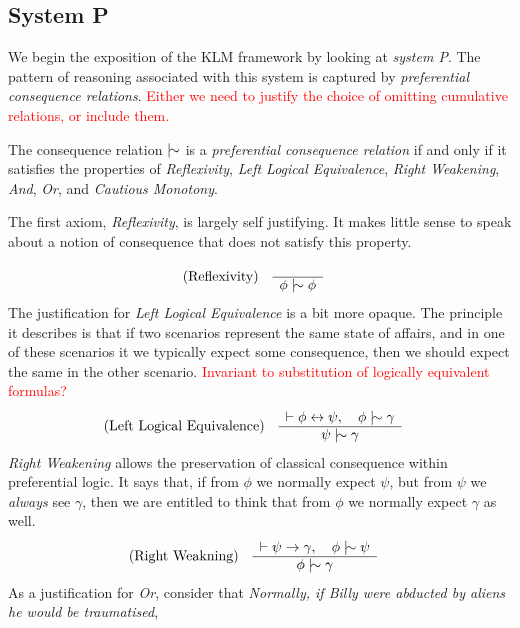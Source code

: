 \subsection{System P}
\label{subsection:system-P} 

We begin the exposition of the KLM framework by looking at \textit{system P}. The pattern of reasoning associated with
this system is captured by \textit{preferential consequence relations}. \textcolor{red}{Either we need to justify the
choice of omitting cumulative relations, or include them.}

\begin{definition}
	\label{definition:preferential-relation}

	The consequence relation $\twiddle$ is a \emph{preferential consequence relation} if and only if it satisfies the properties
	of \emph{Reflexivity}, \emph{Left Logical Equivalence}, \emph{Right Weakening}, \emph{And}, \emph{Or}, and \emph{Cautious
	Monotony}.
\end{definition}
%
The first axiom, \textit{Reflexivity}, is largely self justifying. It makes little sense to speak about a notion of
consequence that does not satisfy this property.
%
\begin{align}
	\label{postulate:ref}\inferLeft{Reflexivity}{}{\phi \twiddle \phi}
\end{align}
%
The justification for \textit{Left Logical Equivalence} is a bit more opaque. The principle it describes is that if two scenarios
represent the same state of affairs, and in one of these scenarios it we typically expect some consequence, then we should
expect the same in the other scenario. \textcolor{red}{Invariant to substitution of logically equivalent formulas?}
%
\begin{align}
	\label{postulate:lle}\inferLeft{Left Logical Equivalence}{\vdash \phi \leftrightarrow \psi, \quad \phi \twiddle \gamma}{\psi \twiddle \gamma}
\end{align}
%
\textit{Right Weakening} allows the preservation of classical consequence within preferential logic. It says that, if
from $\phi$ we normally expect $\psi$, but from $\psi$ we \textit{always} see $\gamma$, then we are entitled to think that
from $\phi$ we normally expect $\gamma$ as well.
%
\begin{align}
	\label{postulate:rw}\inferLeft{Right Weakning}{\vdash \psi \rightarrow \gamma, \quad \phi \twiddle \psi}{\phi \twiddle \gamma}
\end{align}
%
As a justification for \textit{Or}, consider that \textit{Normally, if Billy were abducted by aliens he would be traumatised},
